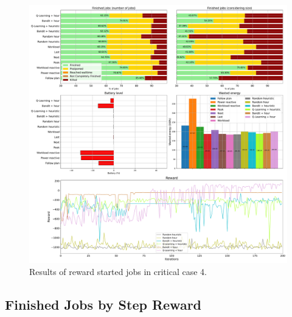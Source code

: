 \begin{figure}[!htb]
    \centering
    \includegraphics[scale=0.29]{Images/Learning_compensations/reward_started_profile_worst_workload_2_with_noise_state_delta.pdf}
    \caption{Results of reward started jobs in critical case 4.}
    \label{fig:started_reward_results_critical_4}
\end{figure}

\clearpage

\subsection{Finished Jobs by Step Reward}


